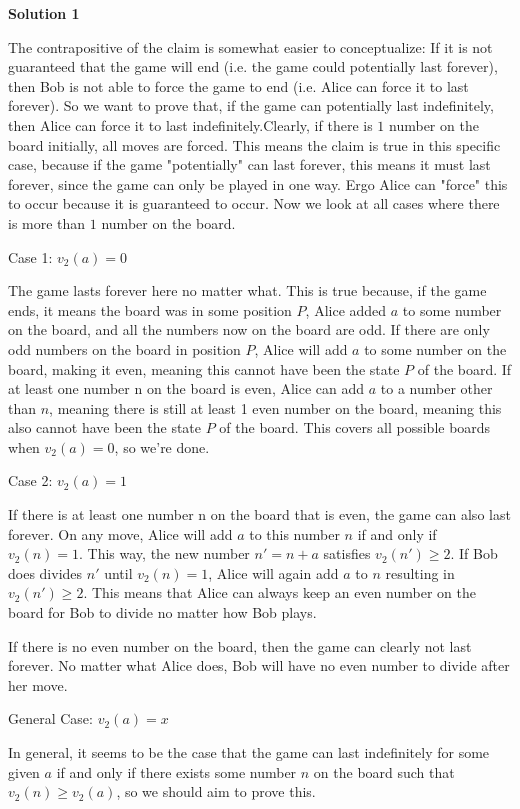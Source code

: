 \begin{enumerate}
 



\textbf{Solution 1}

The contrapositive of the claim is somewhat easier to conceptualize: If it is not guaranteed that the game will end (i.e. the game could potentially last forever), then Bob is not able to force the game to end (i.e. Alice can force it to last forever). So we want to prove that, if the game can potentially last indefinitely, then Alice can force it to last indefinitely.Clearly, if there is $1$ number on the board initially, all moves are forced. This means the claim is true in this specific case, because if the game "potentially" can last forever, this means it must last forever, since the game can only be played in one way. Ergo Alice can "force" this to occur because it is guaranteed to occur. Now we look at all cases where there is more than $1$ number on the board.

 
Case 1: $v_2 (a)=0$

 The game lasts forever here no matter what. This is true because, if the game ends, it means the board was in some position $P$, Alice added $a$ to some number on the board, and all the numbers now on the board are odd. If there are only odd numbers on the board in position $P$, Alice will add $a$ to some number on the board, making it even, meaning this cannot have been the state $P$ of the board. If at least one number n on the board is even, Alice can add $a$ to a number other than $n$, meaning there is still at least 1 even number on the board, meaning this also cannot have been the state $P$ of the board. This covers all possible boards when  $v_2 (a)=0$, so we're done.

 
Case 2: $v_2 (a)=1$

 If there is at least one number n on the board that is even, the game can also last forever. On any move, Alice will add $a$ to this number $n$ if and only if $v_2 (n)=1$. This way, the new number $n'= n+a$ satisfies $v_2 (n') \geq 2$. If Bob does divides $n'$ until $v_2 (n)=1$, Alice will again add $a$ to $n$ resulting in $v_2 (n') \geq 2$. This means that Alice can always keep an even number on the board for Bob to divide no matter how Bob plays.

 If there is no even number on the board, then the game can clearly not last forever. No matter what Alice does, Bob will have no even number to divide after her move.

 
General Case: $v_2 (a)=x$

 In general, it seems to be the case that the game can last indefinitely for some given $a$ if and only if there exists some number $n$ on the board such that $v_2 (n) \geq v_2 (a)$, so we should aim to prove this.


\end{enumerate}
